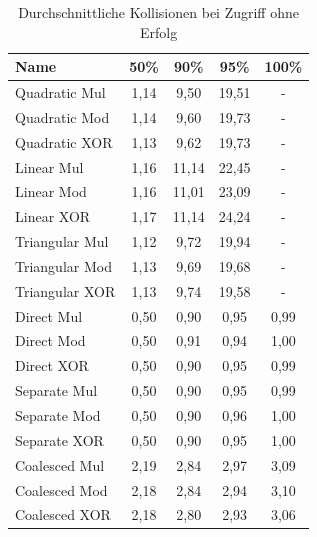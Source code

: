 \begin{table}[!ht]
\begin{tabular}{l|cccc}
    Name & 50\% & 90\% & 95\% & 100\% \\
    \hline
    Quadratic Mul & 1,14 & 9,50 & 19,51 & - \\
    Quadratic Mod & 1,14 & 9,60 & 19,73 & - \\
    Quadratic XOR & 1,13 & 9,62 & 19,73 & - \\
    \hline
    Linear Mul & 1,16 & 11,14 & 22,45 & - \\
    Linear Mod & 1,16 & 11,01 & 23,09 & - \\
    Linear XOR & 1,17 & 11,14 & 24,24 & - \\
    \hline
    Triangular Mul & 1,12 & 9,72 & 19,94 & - \\
    Triangular Mod & 1,13 & 9,69 & 19,68 & - \\
    Triangular XOR & 1,13 & 9,74 & 19,58 & - \\
    \hline
    Direct Mul & 0,50 & 0,90 & 0,95 & 0,99 \\
    Direct Mod & 0,50 & 0,91 & 0,94 & 1,00 \\
    Direct XOR & 0,50 & 0,90 & 0,95 & 0,99 \\
    \hline
    Separate Mul & 0,50 & 0,90 & 0,95 & 0,99 \\
    Separate Mod & 0,50 & 0,90 & 0,96 & 1,00 \\
    Separate XOR & 0,50 & 0,90 & 0,95 & 1,00 \\
    \hline
    Coalesced Mul & 2,19 & 2,84 & 2,97 & 3,09 \\
    Coalesced Mod & 2,18 & 2,84 & 2,94 & 3,10 \\
    Coalesced XOR & 2,18 & 2,80 & 2,93 & 3,06 \\
\end{tabular}
\centering
\caption{Durchschnittliche Kollisionen bei Zugriff ohne Erfolg}
\end{table}
